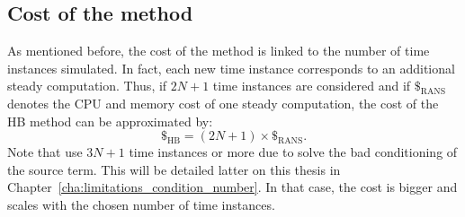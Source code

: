\subsection{Cost of the method}
As mentioned before, the cost of the method is linked to
the number of time instances simulated.
In fact, each new time instance corresponds to an additional steady computation.
Thus, if $2N+1$ time instances are considered and if $\mathdollar_{\text{RANS}}$ 
denotes the CPU and memory cost of
one steady computation, the cost of the HB method can be 
approximated by:
\begin{equation}
	\mathdollar_{\text{HB}} = (2N+1) \times \mathdollar_{\text{RANS}}.
\end{equation}
Note that \citet{Ekici2007,Ekici2008a} use $3N+1$
time instances or more due to solve the bad conditioning of the
source term. This will be detailed latter on this thesis in 
Chapter~\ref{cha:limitations_condition_number}. In that
case, the cost is bigger and scales with the chosen number
of time instances.